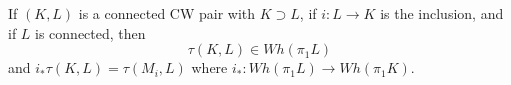 If $(K, L)$ is a connected CW pair with $K \supset L$, if $i: L \to K$ is the inclusion, and if $L$ is connected, then
$$\tau(K, L) \in Wh(\pi_1 L)$$
and $i_* \tau(K, L) = \tau(M_i, L)$ where $i_*: Wh(\pi_1 L) \to Wh(\pi_1 K)$.
